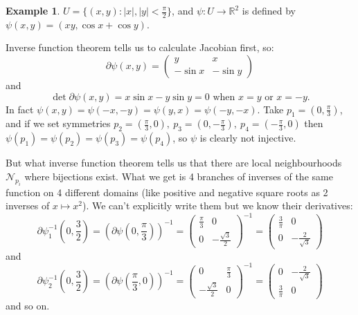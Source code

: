 \documentclass[a4paper]{article}
\theoremstyle{definition}
\newtheorem{eg}[defn]{Example}
\begin{document}
\begin{eg}
$U=\{(x,y):|x|,|y| < \frac{\pi}{2}\}$, and $\psi:U\rightarrow \mathbb R^2$ is defined by $\psi(x,y)=(xy,\cos x+ \cos y)$.

Inverse function theorem tells us to calculate Jacobian first, so:
\[
\partial \psi (x,y) = \begin{pmatrix}
    y & x \\ -\sin x & -\sin y
\end{pmatrix}
\]
and
\[
\det \partial \psi (x,y) = x\sin x-y\sin y=0 \text{ when }x=y\text{ or }x=-y.
\]
In fact $\psi (x,y) = \psi (-x,-y) = \psi (y,x) = \psi(-y,-x)$. Take $p_1=\left(0,\frac{\pi}{3}\right)$, and if we set symmetries $p_2=\left(\frac{\pi}{3},0\right),\ p_3=\left(0,-\frac{\pi}{3}\right),\ p_4=\left(-\frac{\pi}{3},0\right)$ then $\psi(p_1)=\psi(p_2)=\psi(p_3)=\psi(p_4)$, so $\psi$ is clearly not injective.
\begin{center}
\end{center}
But what inverse function theorem tells us that there are local neighbourhoods $\mathcal N_{p_i}$ where bijections exist. What we get is 4 branches of inverses of the same function on 4 different domains (like positive and negative square roots as 2 inverses of $x\mapsto x^2$). We can't explicitly write them but we know their derivatives:
\[
\partial \psi_1 ^{-1} \left(0,\frac32\right) = \left( \partial \psi \left(0,\frac{\pi}{3}\right) \right)^{-1} = \begin{pmatrix}
    \frac{\pi}{3} & 0 \\ 0 & -\frac{\sqrt3}{2}
\end{pmatrix}^{-1} = \begin{pmatrix}
    \frac{3}{\pi} & 0 \\ 0 & -\frac{2}{\sqrt3}
\end{pmatrix}
\]
and
\[
\partial \psi_2 ^{-1} \left(0,\frac32\right) = \left( \partial \psi \left(\frac{\pi}{3},0\right) \right)^{-1} = \begin{pmatrix}
    0 & \frac{\pi}{3} \\ -\frac{\sqrt3}{2} & 0
\end{pmatrix}^{-1} = \begin{pmatrix}
    0 & -\frac{2}{\sqrt3} \\ \frac{3}{\pi} & 0
\end{pmatrix}
\]
and so on.
\end{eg}
\end{document}
